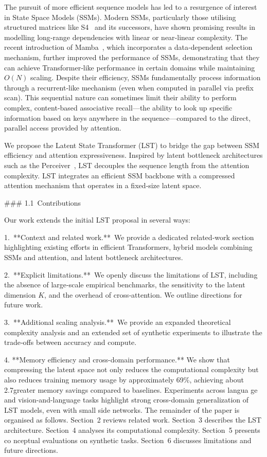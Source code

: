\documentclass[10pt,twocolumn,letterpaper]{article}
\begin{document}
The pursuit of more efficient sequence models has led to a resurgence of interest in State Space Models (SSMs).  Modern SSMs, particularly those utilising structured matrices like S4 \cite{gu2021efficiently} and its successors, have shown promising results in modelling long‑range dependencies with linear or near‑linear complexity.  The recent introduction of Mamba \cite{gu2023mamba}, which incorporates a data‑dependent selection mechanism, further improved the performance of SSMs, demonstrating that they can achieve Transformer‑like performance in certain domains while maintaining $O(N)$ scaling.  Despite their efficiency, SSMs fundamentally process information through a recurrent‑like mechanism (even when computed in parallel via prefix scan).  This sequential nature can sometimes limit their ability to perform complex, content‑based associative recall—the ability to look up specific information based on keys anywhere in the sequence—compared to the direct, parallel access provided by attention.

We propose the Latent State Transformer (LST) to bridge the gap between SSM efficiency and attention expressiveness.  Inspired by latent bottleneck architectures such as the Perceiver \cite{jaegle2021perceiver}, LST decouples the sequence length from the attention complexity.  LST integrates an efficient SSM backbone with a compressed attention mechanism that operates in a fixed‑size latent space.

### 1.1 Contributions

Our work extends the initial LST proposal in several ways:

1. **Context and related work.** We provide a dedicated related‑work section highlighting existing efforts in efficient Transformers, hybrid models combining SSMs and 
attention, and latent bottleneck architectures.

2. **Explicit limitations.** We openly discuss the limitations of LST, including the absence of large‑scale empirical benchmarks, the sensitivity to the  latent dimension $K$, and the overhead of cross‑attention.  We outline directions for future work.

3. **Additional scaling analysis.** We provide an expanded theoretical complexity analysis and an extended set of synthetic experiments to illustrate the trade‑offs between accuracy and compute.

4. **Memory efficiency and cross-domain performance.** We show that compressing the latent space not only reduces the computational complexity but also reduces training memory usage by approximately 69\%, achieving about 2.7\times greater memory savings compared to baselines. Experiments across langua
ge and vision-and-language tasks highlight strong cross-domain generalization of LST models, even with small side networks.
The remainder of the paper is organised as follows.  Section 2 reviews related work.  Section 3 describes the LST architecture.  Section 4 analyses its computational complexity.  Section 5 presents co
nceptual evaluations on synthetic tasks.  Section 6 discusses limitations and future directions.
\end{document}
